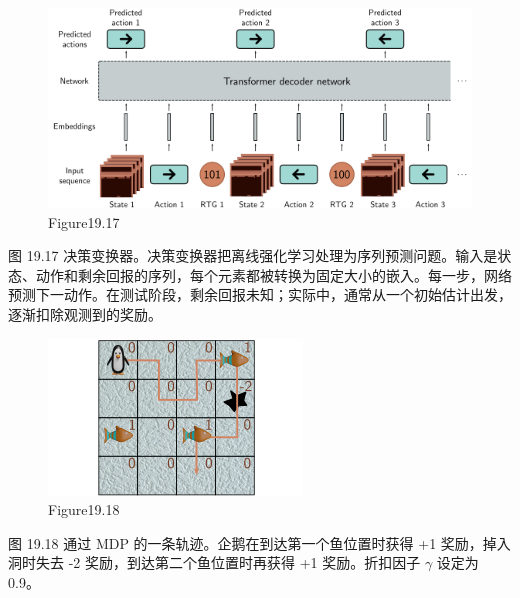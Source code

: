 \begin{figure}[h!]
\centering
\includegraphics[width=0.7\linewidth]{png/chapter19/ReinforceDecisionTransformer.png}
\caption{Figure19.17}
\end{figure}
图 19.17 决策变换器。决策变换器把离线强化学习处理为序列预测问题。输入是状态、动作和剩余回报的序列，每个元素都被转换为固定大小的嵌入。每一步，网络预测下一动作。在测试阶段，剩余回报未知；实际中，通常从一个初始估计出发，逐渐扣除观测到的奖励。

\begin{figure}[h!]
\centering
\includegraphics[width=0.7\linewidth]{png/chapter19/ReinforceProbReturn.png}
\caption{Figure19.18}
\end{figure}
图 19.18 通过 MDP 的一条轨迹。企鹅在到达第一个鱼位置时获得 +1 奖励，掉入洞时失去 -2 奖励，到达第二个鱼位置时再获得 +1 奖励。折扣因子 \(\gamma\) 设定为 0.9。